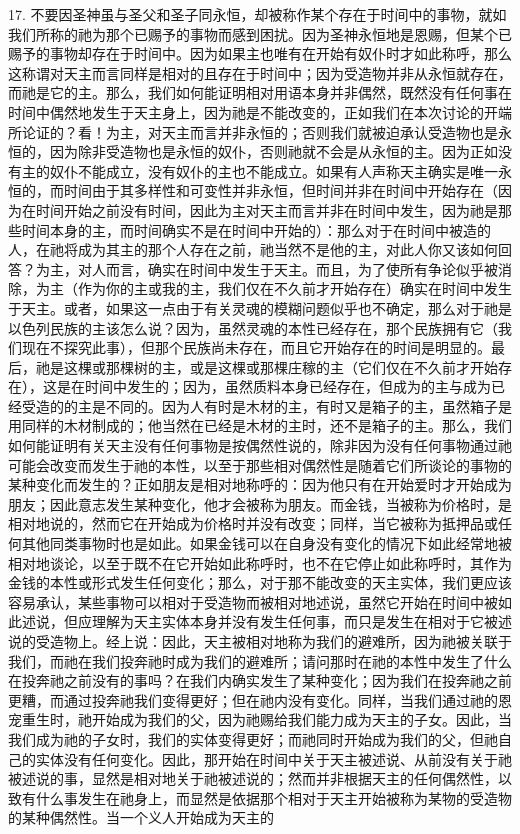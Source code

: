 17. 不要因圣神虽与圣父和圣子同永恒，却被称作某个存在于时间中的事物，就如我们所称的祂为那个已赐予的事物而感到困扰。因为圣神永恒地是恩赐，但某个已赐予的事物却存在于时间中。因为如果主也唯有在开始有奴仆时才如此称呼，那么这称谓对天主而言同样是相对的且存在于时间中；因为受造物并非从永恒就存在，而祂是它的主。那么，我们如何能证明相对用语本身并非偶然，既然没有任何事在时间中偶然地发生于天主身上，因为祂是不能改变的，正如我们在本次讨论的开端所论证的？看！为主，对天主而言并非永恒的；否则我们就被迫承认受造物也是永恒的，因为除非受造物也是永恒的奴仆，否则祂就不会是从永恒的主。因为正如没有主的奴仆不能成立，没有奴仆的主也不能成立。如果有人声称天主确实是唯一永恒的，而时间由于其多样性和可变性并非永恒，但时间并非在时间中开始存在（因为在时间开始之前没有时间，因此为主对天主而言并非在时间中发生，因为祂是那些时间本身的主，而时间确实不是在时间中开始的）：那么对于在时间中被造的人，在祂将成为其主的那个人存在之前，祂当然不是他的主，对此人你又该如何回答？为主，对人而言，确实在时间中发生于天主。而且，为了使所有争论似乎被消除，为主（作为你的主或我的主，我们仅在不久前才开始存在）确实在时间中发生于天主。或者，如果这一点由于有关灵魂的模糊问题似乎也不确定，那么对于祂是以色列民族的主该怎么说？因为，虽然灵魂的本性已经存在，那个民族拥有它（我们现在不探究此事），但那个民族尚未存在，而且它开始存在的时间是明显的。最后，祂是这棵或那棵树的主，或是这棵或那棵庄稼的主（它们仅在不久前才开始存在），这是在时间中发生的；因为，虽然质料本身已经存在，但成为的主与成为已经受造的的主是不同的。因为人有时是木材的主，有时又是箱子的主，虽然箱子是用同样的木材制成的；他当然在已经是木材的主时，还不是箱子的主。那么，我们如何能证明有关天主没有任何事物是按偶然性说的，除非因为没有任何事物通过祂可能会改变而发生于祂的本性，以至于那些相对偶然性是随着它们所谈论的事物的某种变化而发生的？正如朋友是相对地称呼的：因为他只有在开始爱时才开始成为朋友；因此意志发生某种变化，他才会被称为朋友。而金钱，当被称为价格时，是相对地说的，然而它在开始成为价格时并没有改变；同样，当它被称为抵押品或任何其他同类事物时也是如此。如果金钱可以在自身没有变化的情况下如此经常地被相对地谈论，以至于既不在它开始如此称呼时，也不在它停止如此称呼时，其作为金钱的本性或形式发生任何变化；那么，对于那不能改变的天主实体，我们更应该容易承认，某些事物可以相对于受造物而被相对地述说，虽然它开始在时间中被如此述说，但应理解为天主实体本身并没有发生任何事，而只是发生在相对于它被述说的受造物上。经上说：因此，天主被相对地称为我们的避难所，因为祂被关联于我们，而祂在我们投奔祂时成为我们的避难所；请问那时在祂的本性中发生了什么在投奔祂之前没有的事吗？在我们内确实发生了某种变化；因为我们在投奔祂之前更糟，而通过投奔祂我们变得更好；但在祂内没有变化。同样，当我们通过祂的恩宠重生时，祂开始成为我们的父，因为祂赐给我们能力成为天主的子女。因此，当我们成为祂的子女时，我们的实体变得更好；而祂同时开始成为我们的父，但祂自己的实体没有任何变化。因此，那开始在时间中关于天主被述说、从前没有关于祂被述说的事，显然是相对地关于祂被述说的；然而并非根据天主的任何偶然性，以致有什么事发生在祂身上，而显然是依据那个相对于天主开始被称为某物的受造物的某种偶然性。当一个义人开始成为天主的